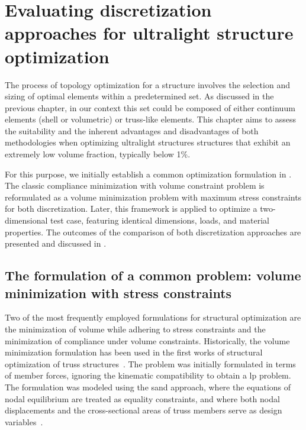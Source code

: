 \setchapterpreamble[u]{\margintoc}
\chapter{Evaluating discretization approaches for ultralight structure optimization}
The process of topology optimization for a structure involves the selection and sizing of optimal elements within a predetermined set. As discussed in the previous chapter, in our context this set could be composed of either continuum elements (shell or volumetric) or truss-like elements. This chapter aims to assess the suitability and the inherent advantages and disadvantages of both methodologies when optimizing ultralight structures \ie structures that exhibit  an extremely low volume fraction, typically below 1\%. 

For this purpose, we initially establish a common optimization formulation in . The classic compliance minimization with volume constraint problem is reformulated as a volume minimization problem with maximum stress constraints for both discretization. Later, this framework is applied to optimize a two-dimensional test case, featuring identical dimensions, loads, and material properties. The outcomes of the comparison of both discretization approaches are presented and discussed in . 

\section{The formulation of a common problem: volume minimization with stress constraints} \label{sec:03_common_prob}
Two of the most frequently employed formulations for structural optimization are the minimization of volume while adhering to stress constraints and the minimization of compliance under volume constraints. Historically, the volume minimization formulation has been used in the first works of structural optimization of truss structures~. The problem was initially formulated in terms of member forces, ignoring the kinematic compatibility to obtain a \gls{lp} problem. The formulation was modeled using the \acrfull{sand} approach, where the equations of nodal equilibrium are treated as equality constraints, and where both nodal displacements and the cross-sectional areas of truss members serve as design variables~. 

